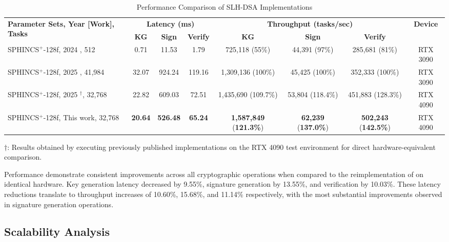 \documentclass[journal]{IEEEtran}
\begin{document}
\begin{table*}[t]
  \centering
  \caption{Performance Comparison of SLH-DSA Implementations}
  \label{tab:comparative_perf}
  \begin{tabular}{@{}lccccccc@{}}
    \toprule
    \multirow{2}{*}{\textbf{Parameter Sets, Year [Work], Tasks}} & \multicolumn{3}{c}{\textbf{Latency (ms)}} & \multicolumn{3}{c}{\textbf{Throughput (tasks/sec)}} & \multirow{2}{*}{\textbf{Device}} \\
    \cmidrule(lr){2-4} \cmidrule(lr){5-7}
    & \textbf{KG} & \textbf{Sign} & \textbf{Verify} & \textbf{KG} & \textbf{Sign} & \textbf{Verify} & \\
    \midrule
    SPHINCS$^+$-128f, 2024 \cite{Kim2024}, 512  & 0.71 & 11.53 & 1.79 & 725,118 (55\%) & 44,391 (97\%) & 285,681 (81\%) & RTX 3090 \\
    SPHINCS$^+$-128f, 2025 \cite{Wang2025}, 41,984 & 32.07 & 924.24 & 119.16 & 1,309,136 (100\%) & 45,425 (100\%) & 352,333 (100\%) & RTX 3090 \\
    SPHINCS$^+$-128f, 2025 \cite{Wang2025}$^\dagger$, 32,768 & 22.82 & 609.03 & 72.51 & 1,435,690 (109.7\%) & 53,804 (118.4\%) & 451,883 (128.3\%) & RTX 4090 \\
    SPHINCS$^+$-128f, This work, 32,768 & \textbf{20.64} & \textbf{526.48} & \textbf{65.24} & \textbf{1,587,849} (\textbf{121.3\%}) & \textbf{62,239} (\textbf{137.0\%}) & \textbf{502,243} (\textbf{142.5\%}) & RTX 4090 \\
    \bottomrule
  \end{tabular}
  \begin{tablenotes}
  \item[] $\dagger$: Results obtained by executing previously published implementations on the RTX 4090 test environment for direct hardware-equivalent comparison.
  \end{tablenotes}
\end{table*}

Performance demonstrate consistent improvements across all cryptographic operations when compared to the reimplementation of \cite{Wang2025} on identical hardware.
Key generation latency decreased by 9.55\%, signature generation by 13.55\%, and verification by 10.03\%. These latency reductions translate to throughput increases of 10.60\%, 15.68\%, and 11.14\% respectively, with the most substantial improvements observed in signature generation operations.

\color{blue}

\subsection{Scalability Analysis}
\end{document}
